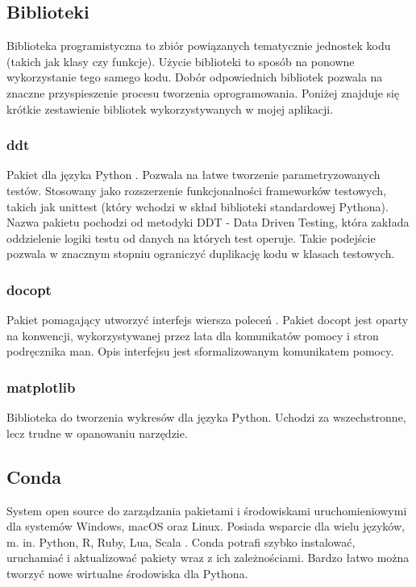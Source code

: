 \subsection{Biblioteki}
Biblioteka programistyczna to zbiór powiązanych tematycznie jednostek kodu (takich jak klasy czy funkcje). Użycie biblioteki to sposób na ponowne wykorzystanie tego samego kodu. Dobór odpowiednich bibliotek pozwala na znaczne przyspieszenie procesu tworzenia oprogramowania. Poniżej znajduje się krótkie zestawienie bibliotek wykorzystywanych w mojej aplikacji.

\subsubsection{ddt}
\label{DdtOpis}
Pakiet dla języka Python \cite{ddt:documentation}. Pozwala na łatwe tworzenie parametryzowanych testów. Stosowany jako rozszerzenie funkcjonalności frameworków testowych, takich jak unittest (który wchodzi w skład biblioteki standardowej Pythona). Nazwa pakietu pochodzi od metodyki DDT - Data Driven Testing, która zakłada oddzielenie logiki testu od danych na których test operuje. Takie podejście pozwala w znacznym stopniu ograniczyć duplikację kodu w klasach testowych.
\subsubsection{docopt}
\label{docoptOpis}
Pakiet pomagający utworzyć interfejs wiersza poleceń \cite{docopt:documentation}. Pakiet docopt jest oparty na konwencji, wykorzystywanej przez lata dla komunikatów pomocy i stron podręcznika man. Opis interfejsu jest sformalizowanym komunikatem pomocy.
\subsubsection{matplotlib}
\label{matplotlibDescription}
Biblioteka do tworzenia wykresów dla języka Python. Uchodzi za wszechstronne, lecz trudne w opanowaniu narzędzie.
\subsection{Conda}
System open source do zarządzania pakietami i środowiskami uruchomieniowymi dla systemów Windows, macOS oraz Linux. Posiada wsparcie dla wielu języków, m. in. Python, R, Ruby, Lua, Scala \cite{conda:documentation}.
Conda potrafi szybko instalować, uruchamiać i aktualizować pakiety wraz z ich zależnościami.
Bardzo łatwo można tworzyć nowe wirtualne środowiska dla Pythona.

